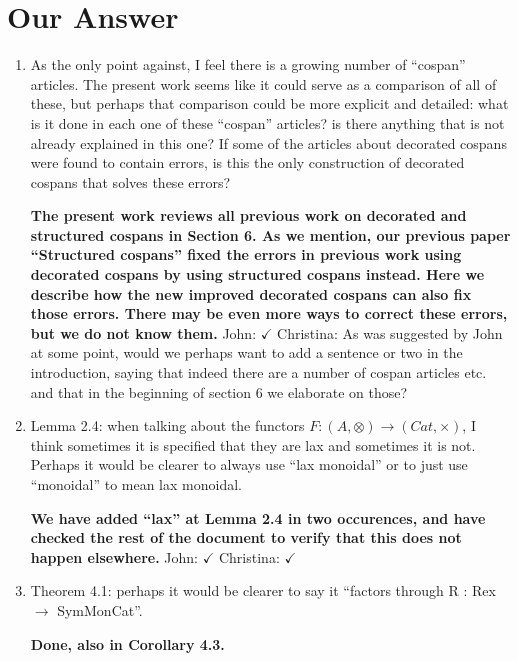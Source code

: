 \documentclass[reqno]{amsart}
\def\chris{\color{purple} Christina: }
\def\john{\color{red} John: }
\begin{document}
\section{Our Answer}


\begin{enumerate}

\item As the only point against, I feel there is a growing number of “cospan” articles. The present work seems like it could serve as a comparison of 
all of 
these, but perhaps that comparison could be more explicit and detailed: what is it done in each one of these “cospan” articles? is there anything 
that 
is not already explained in this one? If some of the articles about decorated cospans were found to contain errors, is this the only construction of 
decorated cospans that solves these errors?

{\bf The present work reviews all previous work on decorated and structured cospans in Section 6.  As we mention, our previous paper ``Structured 
cospans'' fixed the errors in previous work using decorated cospans by using structured cospans instead.   Here we describe how the new improved 
decorated cospans can also fix those errors.     There may be even more ways to correct these errors, but we do not know them.}    {\john 
$\checkmark$}
{\chris As was suggested by John at some point, would we perhaps want to add a sentence or two in the introduction, saying that indeed there are a 
number of cospan articles etc. and that in the beginning of section 6 we elaborate on those?}

 \item Lemma 2.4: when talking about the functors $F : (A,\otimes)\to(Cat,\times)$, I think sometimes it is specified that they are lax and sometimes 
it is not. Perhaps it would be clearer to always use “lax monoidal” or to just use “monoidal” to mean lax monoidal.

{\bf We have added ``lax'' at Lemma 2.4 in two occurences, and have checked the rest of the document to verify that this does not happen 
elsewhere.}  {\john $\checkmark$} {\chris $\checkmark$}

\item Theorem 4.1: perhaps it would be clearer to say it “factors through R : Rex $\to$ SymMonCat”.

{\bf Done, also in Corollary 4.3.}  


\end{enumerate}
\end{document}

